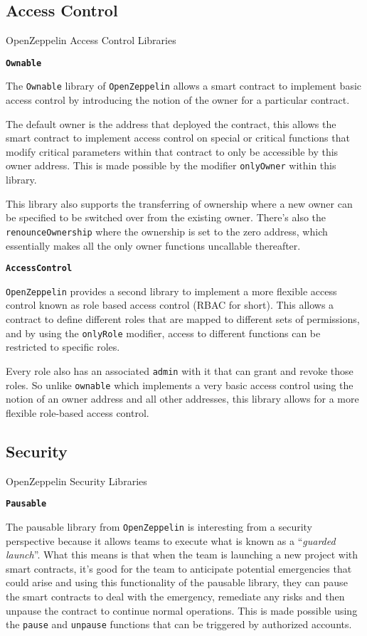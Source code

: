 \subsection{Access Control}\label{access-control}

OpenZeppelin Access Control Libraries

\textbf{\texttt{Ownable}}

The \texttt{Ownable} library of \texttt{OpenZeppelin} allows a smart
contract to implement basic access control by introducing the notion of
the owner for a particular contract.

The default owner is the address that deployed the contract, this allows
the smart contract to implement access control on special or critical
functions that modify critical parameters within that contract to only
be accessible by this owner address. This is made possible by the
modifier \texttt{onlyOwner} within this library.

This library also supports the transferring of ownership where a new
owner can be specified to be switched over from the existing owner.
There's also the \texttt{renounceOwnership} where the ownership is set
to the zero address, which essentially makes all the only owner
functions uncallable thereafter.

\textbf{\texttt{AccessControl}}

\texttt{OpenZeppelin} provides a second library to implement a more
flexible access control known as role based access control (RBAC for
short). This allows a contract to define different roles that are mapped
to different sets of permissions, and by using the \texttt{onlyRole}
modifier, access to different functions can be restricted to specific
roles.

Every role also has an associated \texttt{admin} with it that can grant
and revoke those roles. So unlike \texttt{ownable} which implements a
very basic access control using the notion of an owner address and all
other addresses, this library allows for a more flexible role-based
access control.

\subsection{Security}\label{security}

OpenZeppelin Security Libraries

\textbf{\texttt{Pausable}}

The pausable library from \texttt{OpenZeppelin} is interesting from a
security perspective because it allows teams to execute what is known as
a ``\emph{guarded launch}''. What this means is that when the team is
launching a new project with smart contracts, it's good for the team to
anticipate potential emergencies that could arise and using this
functionality of the pausable library, they can pause the smart
contracts to deal with the emergency, remediate any risks and then
unpause the contract to continue normal operations. This is made
possible using the \texttt{pause} and \texttt{unpause} functions that
can be triggered by authorized accounts.

